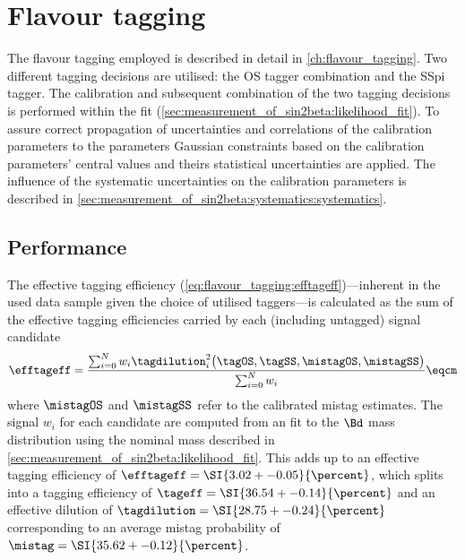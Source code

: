 
\section{Flavour tagging}
\label{sec:measurement_of_sin2beta:flavour_tagging}

The flavour tagging employed is described in detail in
\cref{ch:flavour_tagging}. Two different tagging decisions are utilised: the
\acf{OS} tagger combination and the \acf{SSpi} tagger. The calibration and
subsequent combination of the two tagging decisions is performed within the fit
(\cf \cref{sec:measurement_of_sin2beta:likelihood_fit}). To assure correct
propagation of uncertainties and correlations of the calibration parameters to
the \CP parameters Gaussian constraints based on the calibration parameters'
central values and theirs statistical uncertainties are applied. The influence
of the systematic uncertainties on the calibration parameters is described in
\cref{sec:measurement_of_sin2beta:systematics:systematics}.

\subsection{Performance}
\label{sec:measurement_of_sin2beta:flavour_tagging:performance}

The effective tagging efficiency
(\cref{eq:flavour_tagging:efftageff})---inherent in the used data sample given
the choice of utilised taggers---is calculated as the sum of the effective
tagging efficiencies carried by each (including untagged) signal candidate
%
\begin{equation}
  \efftageff = \frac{\sum_{i=0}^{N} w_i \tagdilution_i^2\big(\tagOS, \tagSS, \mistagOS, \mistagSS \big)}{\sum_{i=0}^{N} w_i}\eqcm
\end{equation}
%
where $\mistagOS$ and $\mistagSS$ refer to the calibrated mistag estimates. The
signal \sWeights $w_i$ for each candidate are computed from an \sPlot fit to the
$\Bd$ mass distribution using the nominal mass \PDF described in
\cref{sec:measurement_of_sin2beta:likelihood_fit}. This adds up to an effective
tagging efficiency of $\efftageff = \SI{3.02 +- 0.05}{\percent}$, which splits
into a tagging efficiency of $\tageff = \SI{36.54
+- 0.14}{\percent}$ and an effective dilution of $\tagdilution = \SI{28.75 +-
0.24}{\percent}$ corresponding to an average mistag probability of $\mistag =
\SI{35.62 +- 0.12}{\percent}$.

